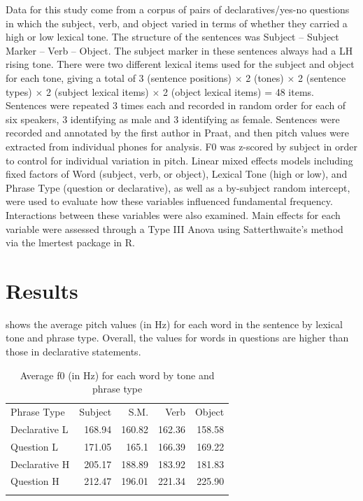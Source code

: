 \documentclass[output=paper,colorlinks,citecolor=brown
]{langscibook}
\begin{document}
Data for this study come from a corpus of pairs of declaratives/yes-no questions in which the subject, verb, and object varied in terms of whether they carried a high or low lexical tone. The structure of the sentences was Subject -- Subject Marker -- Verb -- Object. The subject marker in these sentences always had a LH rising tone. There were two different lexical items used for the subject and object for each tone, giving a total of 3 (sentence positions) $\times$ 2 (tones) $\times$ 2 (sentence types) $\times$ 2 (subject lexical items) $\times$ 2 (object lexical items)  = 48 items. Sentences were repeated 3 times each and recorded in random order for each of six speakers, 3 identifying as male and 3 identifying as female. Sentences were  recorded and annotated by the first author in Praat, and then pitch values were extracted from individual phones for analysis. F0 was z-scored by subject in order to control for individual variation in pitch. Linear mixed effects models including fixed factors of Word (subject, verb, or object), Lexical Tone (high or low), and Phrase Type (question or declarative), as well as a by-subject random intercept, were used to evaluate how these variables influenced fundamental frequency. Interactions between these variables were also examined. Main effects for each variable were assessed through a Type III Anova using Satterthwaite's method via the lmertest package in R.

\section{Results}
\label{sec:gamfranich:4}

 shows the average pitch values (in Hz) for each word in the sentence by lexical tone and phrase type. Overall, the values for words in questions are higher than those in declarative statements.

\begin{table}
    \caption{Average f0 (in Hz) for each word by tone and phrase type}
    \label{tab:gamfranich:1}
    \begin{tabular}{l rrrr}
    \lsptoprule 
        Phrase Type & Subject & S.M. & Verb & Object \\ 
        Declarative L & 168.94 & 160.82 & 162.36 & 158.58 \\ 
        Question L & 171.05 & 165.1 & 166.39 & 169.22 \\ 
        Declarative H & 205.17 & 188.89 & 183.92 & 181.83 \\ 
        Question H & 212.47 & 196.01 & 221.34 & 225.90 \\
    \lspbottomrule
    \end{tabular}
\end{table}
\end{document}
